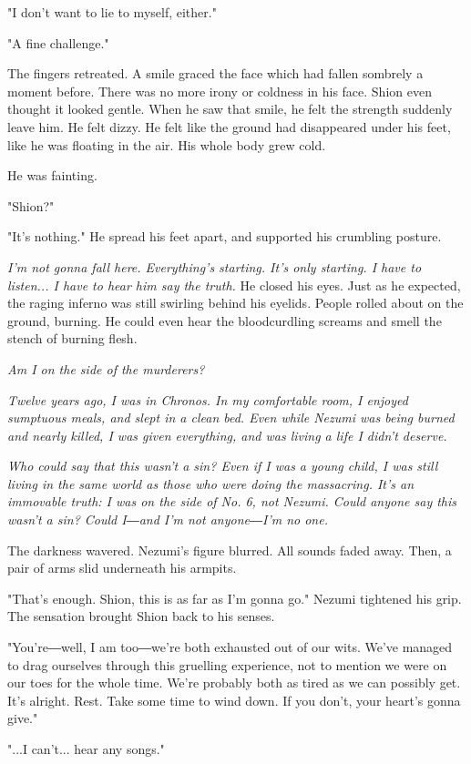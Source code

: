 "I don't want to lie to myself, either."

"A fine challenge."

The fingers retreated. A smile graced the face which had fallen sombrely
a moment before. There was no more irony or coldness in his face. Shion
even thought it looked gentle. When he saw that smile, he felt the
strength suddenly leave him. He felt dizzy. He felt like the ground had
disappeared under his feet, like he was floating in the air. His whole
body grew cold.

He was fainting.

"Shion?"

"It's nothing." He spread his feet apart, and supported his crumbling
posture.

\emph{I'm not gonna fall here. Everything's starting. It's only starting. I
have to listen... I have to hear him say the truth.} He closed his eyes.
Just as he expected, the raging inferno was still swirling behind his
eyelids. People rolled about on the ground, burning. He could even hear
the bloodcurdling screams and smell the stench of burning flesh.

\emph{Am I on the side of the murderers?}

\emph{Twelve years ago, I was in Chronos. In my comfortable room, I enjoyed
sumptuous meals, and slept in a clean bed. Even while Nezumi was being
burned and nearly killed, I was given everything, and was living a life
I didn't deserve.}

\emph{Who could say that this wasn't a sin? Even if I was a young child, I was
still living in the same world as those who were doing the massacring.
It's an immovable truth: I was on the side of No. 6, not Nezumi. Could
anyone say this wasn't a sin? Could I―and I'm not anyone―I'm no one.}

The darkness wavered. Nezumi's figure blurred. All sounds faded away.
Then, a pair of arms slid underneath his armpits.

"That's enough. Shion, this is as far as I'm gonna go." Nezumi tightened
his grip. The sensation brought Shion back to his senses.

"You're―well, I am too―we're both exhausted out of our wits. We've
managed to drag ourselves through this gruelling experience, not to
mention we were on our toes for the whole time. We're probably both as
tired as we can possibly get. It's alright. Rest. Take some time to wind
down. If you don't, your heart's gonna give."

"...I can't... hear any songs."


